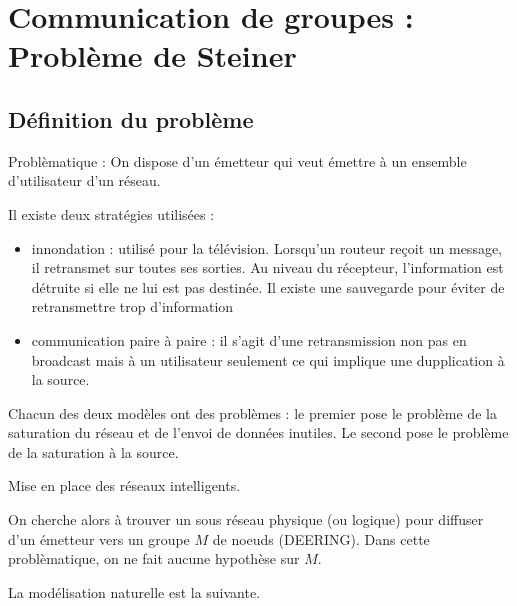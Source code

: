 \documentclass[a4paper,11pt]{thesis}
\begin{document}
\chapter{Communication de groupes : Problème de Steiner}

\section{D\'{e}finition du probl\`{e}me}

Problèmatique : On dispose d'un émetteur qui veut émettre à un ensemble d'utilisateur d'un réseau.

Il existe deux stratégies utilisées :
\begin{itemize}
    \item innondation : utilisé pour la télévision. Lorsqu'un routeur reçoit un message, il
        retransmet sur toutes ses sorties. Au niveau du récepteur, l'information est détruite si
        elle ne lui est pas destinée. Il existe une sauvegarde pour éviter de retransmettre trop
        d'information
    \item communication paire à paire : il s'agit d'une retransmission non pas en broadcast mais
        à un utilisateur seulement ce qui implique une dupplication à la source.
\end{itemize}

Chacun des deux modèles ont des problèmes : le premier pose le problème de la saturation du réseau
et de l'envoi de données inutiles. Le second pose le problème de la saturation à la source.

Mise en place des réseaux intelligents.

On cherche alors à trouver un sous réseau physique (ou logique) pour diffuser d'un émetteur vers un
groupe $M$ de noeuds (DEERING). Dans cette problèmatique, on ne fait aucune hypothèse sur $M$.

La modélisation naturelle est la suivante.


\end{document}
